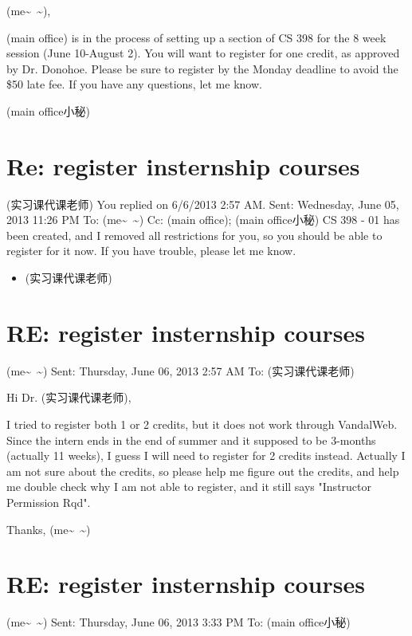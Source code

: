 \documentclass[12pt]{book}
\begin{document}
(me\textasciitilde{}~\textasciitilde{}),

(main office) is in the process of setting up a section of CS 398 for the 8 week session (June 10-August 2).  You will want to register for one credit, as approved by Dr. Donohoe.  Please be sure to register by the Monday deadline to avoid the \$50 late fee. If you have any questions, let me know.

(main office小秘)


\section{Re: register insternship courses}
\label{sec-41-5}
(实习课代课老师)
You replied on 6/6/2013 2:57 AM.
Sent:        Wednesday, June 05, 2013 11:26 PM
To:        
(me\textasciitilde{}~\textasciitilde{})
Cc:        
(main office); (main office小秘)
CS 398 - 01 has been created, and I removed all restrictions for you, so you should be able to register for it now. If you have trouble, please let me know.

\begin{itemize}
\item (实习课代课老师)
\end{itemize}


\section{RE: register insternship courses}
\label{sec-41-6}
(me\textasciitilde{}~\textasciitilde{})
Sent:        Thursday, June 06, 2013 2:57 AM
To: (实习课代课老师)

Hi Dr. (实习课代课老师), 

I tried to register both 1 or 2 credits, but it does not work through VandalWeb. Since the intern ends in the end of summer and it supposed to be 3-months (actually 11 weeks), I guess I will need to register for 2 credits instead. Actually I am not sure about the credits, so please help me figure out the credits, and help me double check why I am not able to register, and it still says "Instructor Permission Rqd". 

Thanks,
(me\textasciitilde{}~\textasciitilde{})


\section{RE: register insternship courses}
\label{sec-41-7}
(me\textasciitilde{}~\textasciitilde{})
Sent:        Thursday, June 06, 2013 3:33 PM
To:        
(main office小秘)
\end{document}
